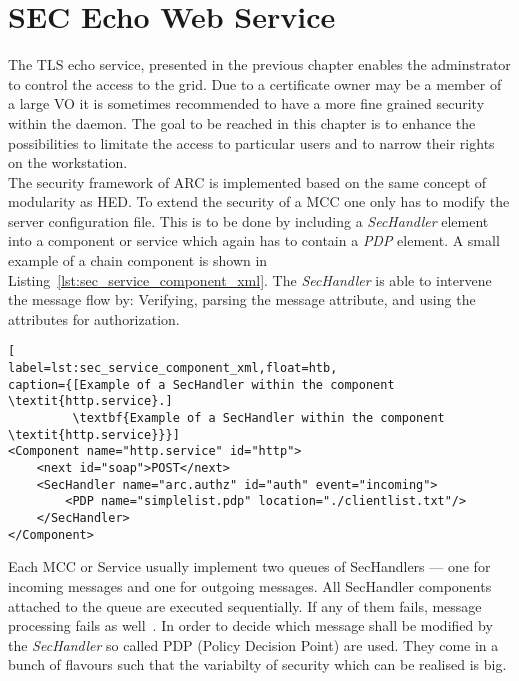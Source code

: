 \chapter{SEC Echo Web Service}

The TLS echo service, presented in the previous chapter enables the adminstrator to control the access to the grid. Due to a certificate owner may be a member of a large VO it is sometimes recommended to have a more fine grained security within the daemon. 
The goal to be reached in this chapter is to enhance the possibilities to limitate the access to particular users and to narrow their rights on the workstation.\\


The security framework of ARC is implemented based on the same concept of modularity as HED. 
To extend the security of a MCC one only has to modify the server configuration file. This is to be done by including a \textit{SecHandler} element into a component or service which again has to contain a \textit{PDP} element. A small example of a chain component is shown in Listing~\ref{lst:sec_service_component_xml}. The \textit{SecHandler} is able to intervene the message flow by: Verifying, parsing the message attribute, and using the attributes for authorization.

%
%
\begin{lstlisting}[
label=lst:sec_service_component_xml,float=htb,
caption={[Example of a SecHandler within the component \textit{http.service}.]
         \textbf{Example of a SecHandler within the component \textit{http.service}}}]
<Component name="http.service" id="http">
	<next id="soap">POST</next>
	<SecHandler name="arc.authz" id="auth" event="incoming">
		<PDP name="simplelist.pdp" location="./clientlist.txt"/>
	</SecHandler>
</Component>
\end{lstlisting}
Each MCC or Service usually implement two queues of SecHandlers --- one for incoming messages and one for outgoing messages.
All SecHandler components attached to the queue are executed sequentially. If any of them fails, message processing fails as well~\cite{QIANG_2008}.
In order to decide which message shall be modified by the \textit{SecHandler} so called PDP (Policy Decision Point) are used. They come in a bunch of flavours such that the variabilty of security which can be realised is big.\\



